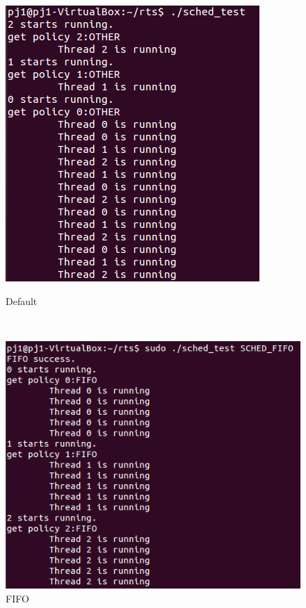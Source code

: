 \documentclass[12pt]{article}
\begin{document}
\begin{figure}[h]
	\centering
	\begin{minipage}[b]{0.4\textwidth}
		\includegraphics[width=\textwidth]{fig_default}
		\caption[Caption for the list of figures]{Default}
		\label{fig:default}
	\end{minipage}
	~
	\begin{minipage}[b]{0.52\textwidth}
		\includegraphics[width=\textwidth]{fig_fifo}
		\caption[Caption for the list of figures]{FIFO}
		\label{fig:fifo}
	\end{minipage}
\end{figure}
\end{document}
